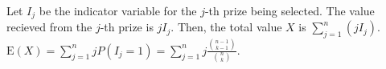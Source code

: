 Let $I_{j}$ be the indicator variable for the $j$-th prize being selected. The
value recieved from the $j$-th prize is $jI_{j}$. Then, the total value
$X$ is $\sum_{j=1}^{n}(jI_{j})$. $\text{E}(X) = \sum_{j=1}^{n}jP(I_{j}=1) = \sum_
{j=1}^{n}j\frac{\binom{n-1}{k-1}}{\binom{n}{k}}.$